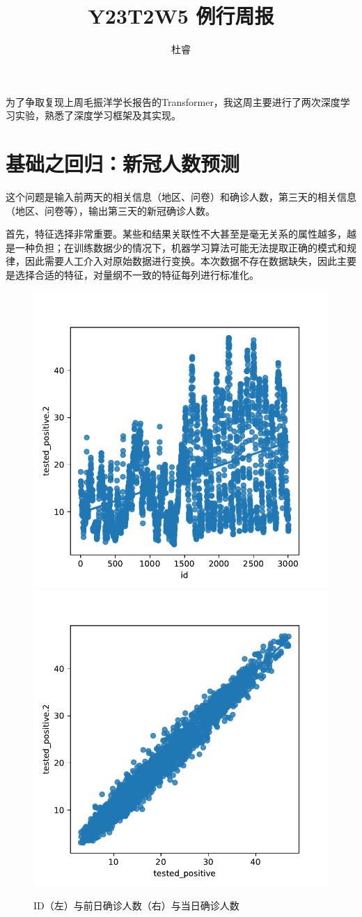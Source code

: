 \documentclass[a4paper,12pt]{ctexart}
\title{Y23T2W5 例行周报}
\author{杜睿}
\begin{document}
\maketitle


为了争取复现上周毛振洋学长报告的\cite{10228982}Transformer，我这周主要进行了两次深度学习实验，熟悉了深度学习框架及其实现。

\section{基础之回归：新冠人数预测}

这个问题是输入前两天的相关信息（地区、问卷）和确诊人数，第三天的相关信息（地区、问卷等），输出第三天的新冠确诊人数。

首先，特征选择非常重要。某些和结果关联性不大甚至是毫无关系的属性越多，越是一种负担；在训练数据少的情况下，机器学习算法可能无法提取正确的模式和规律，因此需要人工介入对原始数据进行变换。本次数据不存在数据缺失，因此主要是选择合适的特征，对量纲不一致的特征每列进行标准化。

\begin{figure}[htbp]
    \centering
    \includegraphics[width=0.45\linewidth]{1.pdf}
    \includegraphics[width=0.45\linewidth]{0.pdf}
    \caption{ID（左）与前日确诊人数（右）与当日确诊人数}
\end{figure}
\end{document}
